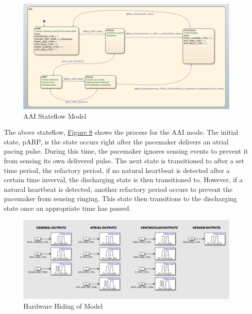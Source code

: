 \documentclass{article}
\newcounter{subsubsubsection}[subsubsection]
\begin{document}
\newpage
{}
\begin{tcolorbox}
    \begin{figure}[H]\label{AAISF}
        \includegraphics[width=\textwidth]{AAI.png}
        \caption{AAI Stateflow Model}        
    \end{figure}
\end{tcolorbox}
The above stateflow, \hyperref[AAISF]{Figure 8} shows the process for the AAI mode. The initial state, pARP, is 
the state occurs right after the pacemaker delivers an atrial pacing pulse. During this time, the pacemaker ignores 
sensing events to prevent it from sensing its own delivered pulse. The next state is transitioned to after 
a set time period, the refactory period, if no natural heartbeat is detected after a certain time inverval, the 
discharging state is then transitioned to. However, if a natural heartbeat is detected, another refactory period occurs 
to prevent the pacemaker from sensing ringing. This state then transitions to the discharging state once an appropriate time 
has passed. 

\newpage
{}

\begin{tcolorbox}
    \begin{figure}[H]\label{HardHide}
        \includegraphics[width=\textwidth]{HardwareHiding.png}
        \caption{Hardware Hiding of Model}        
    \end{figure}
\end{tcolorbox}
\end{document}
